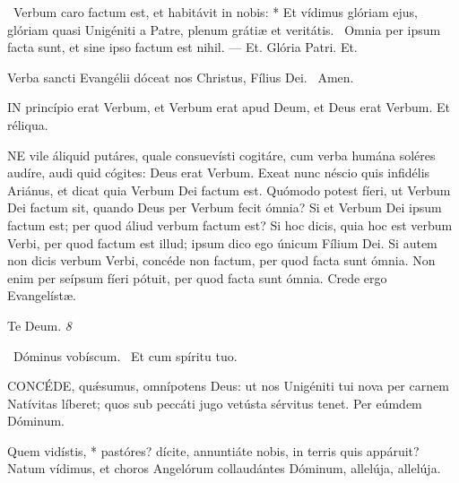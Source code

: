 \R\ Verbum caro factum est, et habitávit in nobis: * Et vídimus glóriam ejus, glóriam quasi Unigéniti a Patre, plenum grátiæ et veritátis. \V\ Omnia per ipsum facta sunt, et sine ipso factum est nihil. --- Et. Glória Patri. Et.

 Verba sancti Evangélii dóceat nos Christus, Fílius Dei. \R\ Amen.



\lettrine[lines=2]{I}{N} princípio erat Verbum, et Verbum erat apud Deum, et Deus erat Verbum. Et réliqua.



\lettrine[lines=2]{N}{E} vile áliquid putáres, quale consuevísti cogitáre, cum verba humána soléres audíre, audi quid cógites: Deus erat Verbum. Exeat nunc néscio quis infidélis Ariánus, et dicat quia Verbum Dei factum est. Quómodo potest fíeri, ut Verbum Dei factum sit, quando Deus per Verbum fecit ómnia? Si et Verbum Dei ipsum factum est; per quod áliud verbum factum est? Si hoc dicis, quia hoc est verbum Verbi, per quod factum est illud; ipsum dico ego únicum Fílium Dei. Si autem non dicis verbum Verbi, concéde non factum, per quod facta sunt ómnia. Non enim per seípsum fíeri pótuit, per quod facta sunt ómnia. Crede ergo Evangelístæ.

 Te Deum. \textit{8}


\V\ Dóminus vobíscum. \R\ Et cum spíritu tuo.


\lettrine[lines=2]{C}{ONCÉDE}, quǽsumus, omnípotens Deus: ut nos Unigéniti tui nova per carnem Natívitas líberet; quos sub peccáti jugo vetústa sérvitus tenet. Per eúmdem Dóminum.




 Quem vidístis, * pastóres? dícite, annuntiáte nobis, in terris quis appáruit? Natum vídimus, et choros Angelórum collaudántes Dóminum, allelúja, allelúja.

